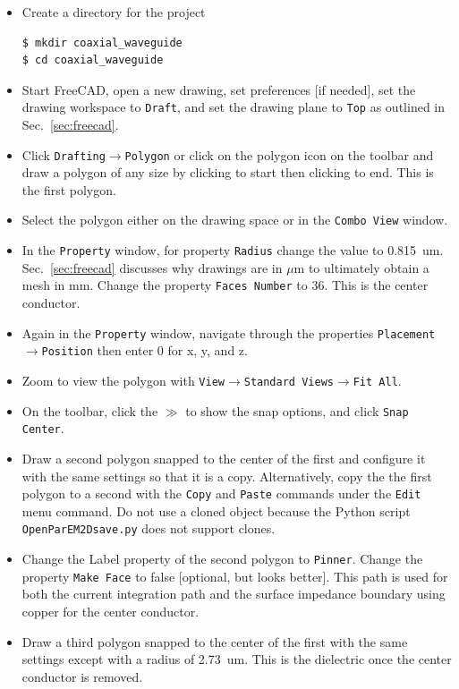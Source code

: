 \documentclass[titlepage]{article}
\renewcommand\_{\textunderscore\linebreak[1]}
\begin{document}
\begin{itemize}
\item Create a directory for the project
\begin{Verbatim}[fontsize=\small]
$ mkdir coaxial_waveguide
$ cd coaxial_waveguide
\end{Verbatim}
\item Start FreeCAD, open a new drawing, set preferences [if needed], set the drawing workspace to \texttt{Draft}, and set the drawing plane to \texttt{Top} as outlined in Sec.~\ref{sec:freecad}.
\item Click \texttt{Drafting}$\rightarrow$\texttt{Polygon} or click on the polygon icon on the toolbar and draw a polygon of any size by clicking to start then clicking to end.  This is the first polygon.
\item Select the polygon either on the drawing space or in the \texttt{Combo View} window.
\item In the \texttt{Property} window, for property \texttt{Radius} change the value to 0.815~um.  Sec.~\ref{sec:freecad} discusses why drawings are in $\mu$m to ultimately obtain a mesh in mm.  Change the property \texttt{Faces Number} to 36. This is the center conductor.
\item Again in the \texttt{Property} window, navigate through the properties \texttt{Placement}$\rightarrow$\texttt{Position} then enter 0 for x, y, and z.
\item Zoom to view the polygon  with \texttt{View}$\rightarrow$\texttt{Standard Views}$\rightarrow$\texttt{Fit All}.
\item On the toolbar, click the $\gg$ to show the snap options, and click \texttt{Snap Center}.
\item Draw a second polygon snapped to the center of the first and configure it with the same settings so that it is a copy.  Alternatively, copy the the first polygon to a second with the \texttt{Copy} and \texttt{Paste} commands under the \texttt{Edit} menu command.  Do not use a cloned object because the Python script \texttt{OpenParEM2D\_save.py} does not support clones.
\item Change the Label property of the second polygon to \texttt{\_Pinner}.  Change the property \texttt{Make Face} to false [optional, but looks better]. This path is used for both the current integration path and the surface impedance boundary using copper for the center conductor.
\item Draw a third polygon snapped to the center of the first with the same settings except with a radius of 2.73~um.  This is the dielectric once the center conductor is removed.

\end{itemize}
\end{document}
